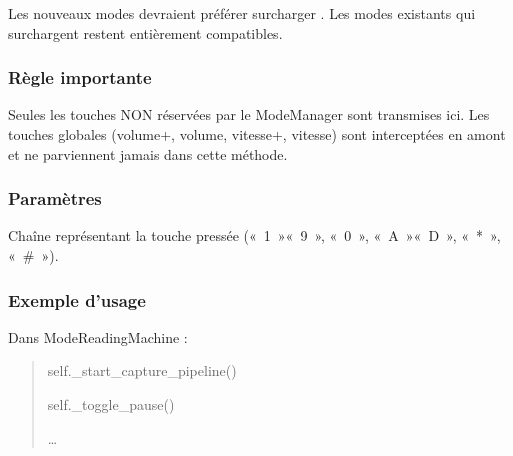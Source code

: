 \documentclass[letterpaper,10pt,french]{sphinxmanual}
\begin{document}
\begin{fulllineitems}
\begin{fulllineitems}
\sphinxAtStartPar
Les nouveaux modes devraient préférer surcharger .
Les modes existants qui surchargent  restent
entièrement compatibles.


\subsubsection{Règle importante}
\label{\detokenize{api/core:regle-importante}}
\sphinxAtStartPar
Seules les touches NON réservées par le ModeManager sont
transmises ici. Les touches globales (volume+, volume\sphinxhyphen{},
vitesse+, vitesse\sphinxhyphen{}) sont interceptées en amont et ne
parviennent jamais dans cette méthode.


\subsubsection{Paramètres}
\label{\detokenize{api/core:parametres}}\begin{description}
\sphinxAtStartPar
Chaîne représentant la touche pressée (« 1 »\textendash{}« 9 », « 0 »,
« A »\textendash{}« D », « * », « \# »).

\end{description}


\subsubsection{Exemple d’usage}
\label{\detokenize{api/core:exemple-dusage}}
\sphinxAtStartPar
Dans ModeReadingMachine :
\begin{quote}
\begin{description}
\begin{description}
\sphinxAtStartPar
self.\_start\_capture\_pipeline()

\sphinxAtStartPar
self.\_toggle\_pause()

\end{description}

\sphinxAtStartPar
…

\end{description}
\end{quote}

\end{fulllineitems}


\end{fulllineitems}
\end{document}
